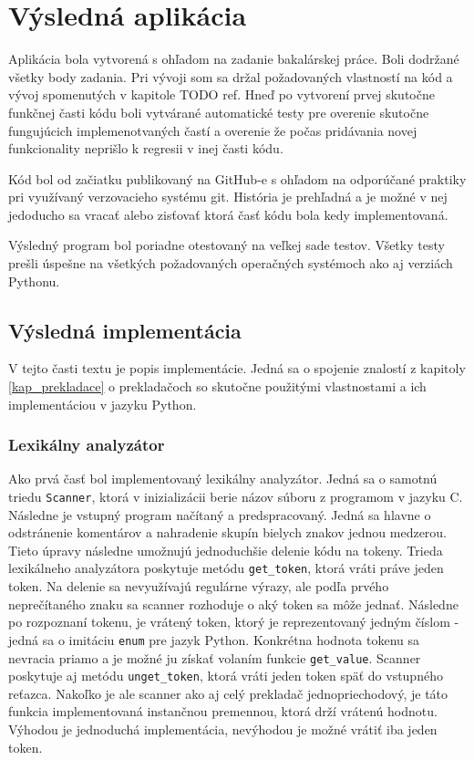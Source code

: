 \chapter{Výsledná aplikácia}
Aplikácia bola vytvorená s ohľadom na zadanie bakalárskej práce. Boli dodržané všetky body zadania. Pri vývoji som sa držal požadovaných vlastností na kód a vývoj spomenutých v kapitole TODO ref. Hneď po vytvorení prvej skutočne funkčnej časti kódu boli vytvárané automatické testy pre overenie skutočne fungujúcich implemenotvaných častí a overenie že počas pridávania novej funkcionality neprišlo k regresii v inej časti kódu. 

Kód bol od začiatku publikovaný na GitHub-e s ohľadom na odporúčané praktiky pri využívaný verzovacieho systému git. História je prehľadná a je možné v nej jedoducho sa vracať alebo zisťovať ktorá časť kódu bola kedy implementovaná.

Výsledný program bol poriadne otestovaný na veľkej sade testov. Všetky testy prešli úspešne na všetkých požadovaných operačných systémoch ako aj verziách Pythonu.



\section{Výsledná implementácia}
V tejto časti textu je popis implementácie. Jedná sa o spojenie znalostí z kapitoly \ref{kap_prekladace} o prekladačoch so skutočne použitými vlastnostami a ich implementáciou v jazyku Python.
\subsection{Lexikálny analyzátor}
Ako prvá časť bol implementovaný lexikálny analyzátor. Jedná sa o samotnú triedu \texttt{Scanner}, ktorá v inizializácii berie názov súboru z programom v jazyku C. Následne je vstupný program načítaný a predspracovaný. Jedná sa hlavne o odstránenie komentárov a nahradenie skupín bielych znakov jednou medzerou. Tieto úpravy následne umožnujú jednoduchšie delenie kódu na tokeny. Trieda lexikálneho analyzátora poskytuje metódu \texttt{get\_token}, ktorá vráti práve jeden token. Na delenie sa nevyužívajú regulárne výrazy, ale podľa prvého neprečítaného znaku sa scanner rozhoduje o aký token sa môže jednať. Následne po rozpoznaní tokenu, je vrátený token, ktorý je reprezentovaný jedným číslom - jedná sa o imitáciu \texttt{enum} pre jazyk Python. Konkrétna hodnota tokenu sa nevracia priamo a je možné ju získať volaním funkcie \texttt{get\_value}. Scanner poskytuje aj metódu \texttt{unget\_token}, ktorá vráti jeden token späť do vstupného reťazca. Nakoľko je ale scanner ako aj celý prekladač jednopriechodový, je táto funkcia implementovaná instančnou premennou, ktorá drží vrátenú hodnotu. Výhodou je jednoduchá implementácia, nevýhodou je možné vrátiť iba jeden token.

